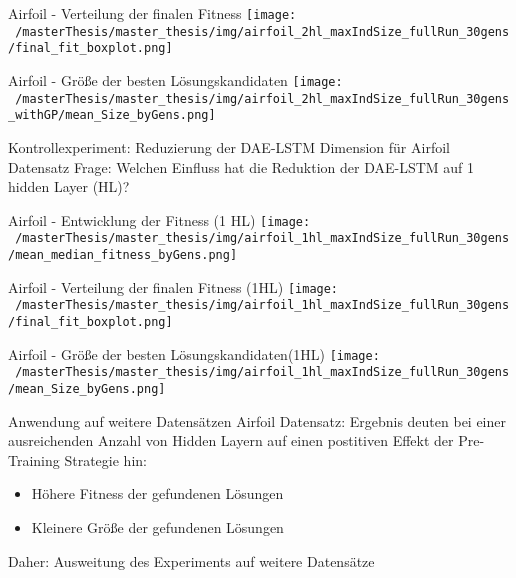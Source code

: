 \documentclass[
  ignorenonframetext,
]{beamer}
\providecommand{\tightlist}{%
  \setlength{\itemsep}{0pt}\setlength{\parskip}{0pt}}
\begin{document}
\begin{frame}{Airfoil - Verteilung der finalen Fitness}
\protect\hypertarget{airfoil---verteilung-der-finalen-fitness}{}
\texttt{[image: ~/masterThesis/master\_thesis/img/airfoil\_2hl\_maxIndSize\_fullRun\_30gens/final\_fit\_boxplot.png]}
\end{frame}

\begin{frame}{Airfoil - Größe der besten Lösungskandidaten}
\protect\hypertarget{airfoil---gruxf6uxdfe-der-besten-luxf6sungskandidaten}{}
\texttt{[image: ~/masterThesis/master\_thesis/img/airfoil\_2hl\_maxIndSize\_fullRun\_30gens\_withGP/mean\_Size\_byGens.png]}
\end{frame}

\begin{frame}{Kontrollexperiment: Reduzierung der DAE-LSTM Dimension für
Airfoil Datensatz}
\protect\hypertarget{kontrollexperiment-reduzierung-der-dae-lstm-dimension-fuxfcr-airfoil-datensatz}{}
Frage: Welchen Einfluss hat die Reduktion der DAE-LSTM auf 1 hidden
Layer (HL)?
\end{frame}

\begin{frame}{Airfoil - Entwicklung der Fitness (1 HL)}
\protect\hypertarget{airfoil---entwicklung-der-fitness-1-hl}{}
\texttt{[image: ~/masterThesis/master\_thesis/img/airfoil\_1hl\_maxIndSize\_fullRun\_30gens/mean\_median\_fitness\_byGens.png]}
\end{frame}

\begin{frame}{Airfoil - Verteilung der finalen Fitness (1HL)}
\protect\hypertarget{airfoil---verteilung-der-finalen-fitness-1hl}{}
\texttt{[image: ~/masterThesis/master\_thesis/img/airfoil\_1hl\_maxIndSize\_fullRun\_30gens/final\_fit\_boxplot.png]}
\end{frame}

\begin{frame}{Airfoil - Größe der besten Lösungskandidaten(1HL)}
\protect\hypertarget{airfoil---gruxf6uxdfe-der-besten-luxf6sungskandidaten1hl}{}
\texttt{[image: ~/masterThesis/master\_thesis/img/airfoil\_1hl\_maxIndSize\_fullRun\_30gens/mean\_Size\_byGens.png]}
\end{frame}

\begin{frame}{Anwendung auf weitere Datensätzen}
\protect\hypertarget{anwendung-auf-weitere-datensuxe4tzen}{}
Airfoil Datensatz: Ergebnis deuten bei einer ausreichenden Anzahl von
Hidden Layern auf einen postitiven Effekt der Pre-Training Strategie
hin:

\begin{itemize}
\tightlist
\item
  Höhere Fitness der gefundenen Lösungen
\item
  Kleinere Größe der gefundenen Lösungen
\end{itemize}

Daher: Ausweitung des Experiments auf weitere Datensätze
\end{frame}
\end{document}

